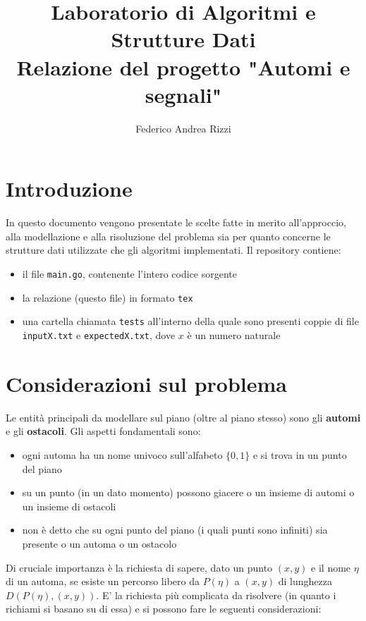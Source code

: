 \documentclass[a4paper,11pt]{article}
\title{Laboratorio di Algoritmi e Strutture Dati \\ Relazione del progetto "Automi e segnali"}
\author{Federico Andrea Rizzi}
\date{}
\begin{document}
\maketitle


\section{Introduzione}

In questo documento vengono presentate le scelte fatte in merito all'approccio, alla modellazione e alla risoluzione del problema sia per quanto concerne le strutture dati utilizzate che gli algoritmi implementati. Il repository contiene:

\begin{itemize}
    \item il file \texttt{main.go}, contenente l'intero codice sorgente

    \item la relazione (questo file) in formato \texttt{tex}

    \item una cartella chiamata \texttt{tests} all'interno della quale sono presenti coppie di file \texttt{inputX.txt} e \texttt{expectedX.txt}, dove $x$ è un numero naturale
\end{itemize}


\section{Considerazioni sul problema}

Le entità principali da modellare sul piano (oltre al piano stesso) sono gli \textbf{automi} e gli \textbf{ostacoli}. Gli aspetti fondamentali sono:

\begin{itemize}
    \item ogni automa ha un nome univoco sull'alfabeto $\{0, 1\}$ e si trova in un punto del piano

    \item su un punto (in un dato momento) possono giacere o un insieme di automi o un insieme di ostacoli 

    \item non è detto che su ogni punto del piano (i quali punti sono infiniti) sia presente o un automa o un ostacolo
\end{itemize} 

Di cruciale importanza è la richiesta di sapere, dato un punto $(x, y)$ e il nome $\eta$ di un automa, se esiste un percorso libero da $P(\eta)$ a $(x, y)$ di lunghezza $D(P(\eta), (x, y))$. E' la richiesta più complicata da risolvere (in quanto i richiami si basano su di essa) e si possono fare le seguenti considerazioni:
\end{document}
